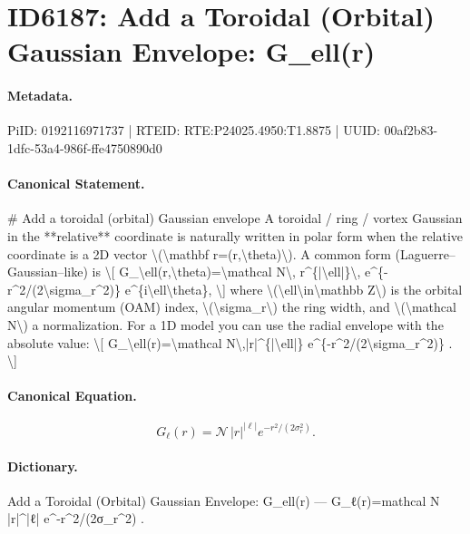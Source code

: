 \section*{ID6187: Add a Toroidal (Orbital) Gaussian Envelope: G\_ell(r)}
\paragraph{Metadata.}
PiID: 0192116971737 | RTEID: RTE:P24025.4950:T1.8875 | UUID: 00af2b83-1dfc-53a4-986f-ffe4750890d0

\paragraph{Canonical Statement.}
\# Add a toroidal (orbital) Gaussian envelope A toroidal / ring / vortex Gaussian in the **relative** coordinate is naturally written in polar form when the relative coordinate is a 2D vector \textbackslash{}(\textbackslash{}mathbf r=(r,\textbackslash{}theta)\textbackslash{}). A common form (Laguerre–Gaussian–like) is \textbackslash{}[ G\_\textbackslash{}ell(r,\textbackslash{}theta)=\textbackslash{}mathcal N\textbackslash{}, r\textasciicircum{}\{|\textbackslash{}ell|\}\textbackslash{}, e\textasciicircum{}\{-r\textasciicircum{}2/(2\textbackslash{}sigma\_r\textasciicircum{}2)\} e\textasciicircum{}\{i\textbackslash{}ell\textbackslash{}theta\}, \textbackslash{}] where \textbackslash{}(\textbackslash{}ell\textbackslash{}in\textbackslash{}mathbb Z\textbackslash{}) is the orbital angular momentum (OAM) index, \textbackslash{}(\textbackslash{}sigma\_r\textbackslash{}) the ring width, and \textbackslash{}(\textbackslash{}mathcal N\textbackslash{}) a normalization. For a 1D model you can use the radial envelope with the absolute value: \textbackslash{}[ G\_\textbackslash{}ell(r)=\textbackslash{}mathcal N\textbackslash{},|r|\textasciicircum{}\{|\textbackslash{}ell|\} e\textasciicircum{}\{-r\textasciicircum{}2/(2\textbackslash{}sigma\_r\textasciicircum{}2)\} . \textbackslash{}]

\paragraph{Canonical Equation.}
\[
G_\ell(r)=\mathcal N\,|r|^{|\ell|} e^{-r^2/(2\sigma_r^2)} .
\]

\paragraph{Dictionary.}
Add a Toroidal (Orbital) Gaussian Envelope: G\_ell(r) — G\_ℓ(r)=mathcal N |r|\textasciicircum{}|ℓ| e\textasciicircum{}-r\textasciicircum{}2/(2σ\_r\textasciicircum{}2) .

